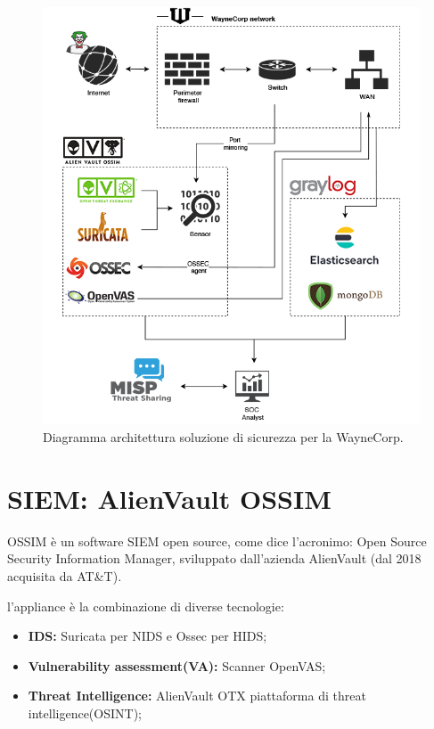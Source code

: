 \newpage

 \begin{figure}[h]
    \begin{center}
        \includegraphics[width=0.98\columnwidth]{images/4_caso_d'uso_img/architettura_wayneCorp.png}
    \end{center}
    \caption{Diagramma architettura soluzione di sicurezza per la WayneCorp.}
    \label{fig:Diagramma architettura soluzione di sicurezza per la WayneCorp.}
\end{figure}

\newpage

\section{SIEM: AlienVault OSSIM}


OSSIM è un software SIEM open source, come dice l'acronimo: Open Source Security Information Manager, sviluppato dall’azienda AlienVault (dal 2018 acquisita da AT\&T).\par

l’appliance è la combinazione di diverse tecnologie:

\begin{itemize}
    \item\textbf{IDS:} Suricata per NIDS e Ossec per HIDS;
    \item\textbf{Vulnerability assessment(VA):} Scanner OpenVAS;
    \item\textbf{Threat Intelligence:} AlienVault OTX piattaforma di threat intelligence(OSINT);
\end{itemize}


